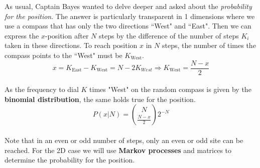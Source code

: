 \documentclass[12pt, a4paper]{scrartcl}
\begin{document}
As usual, Captain Bayes wanted to delve deeper and asked about the \textit{probability for the position}. The answer is particularly transparent in 1 dimensions where we use a compass that has only the two directions ``West" and ``East".
Then we can express the $x$-position after $N$ steps by the difference of the number of steps $K_i$ taken in these directions.
To reach position $x$ in $N$ steps, the number of times the compass points to the ``West" must be $K_{\text{West}}$.
\begin{equation*}\boxed{x = K_{\text{East}} - K_{\text{West}} = N - 2K_{West}\Rightarrow K_{\text{West}}=\frac{N-x}{2}
}\end{equation*}\\
As the frequency to dial $K$ times "West" on the random compass is given by the \textbf{binomial distribution}, the same holds true for the position.
\begin{equation*}\boxed{P(x|N)={N\choose \frac{N-x}{2}} 2^{-N}
}\end{equation*}\\
Note that in an even or odd number of steps, only an even or odd site can be reached.
For the 2D case we will use \textbf{Markov processes} and matrices to determine the probability for the position.\\
\end{document}
